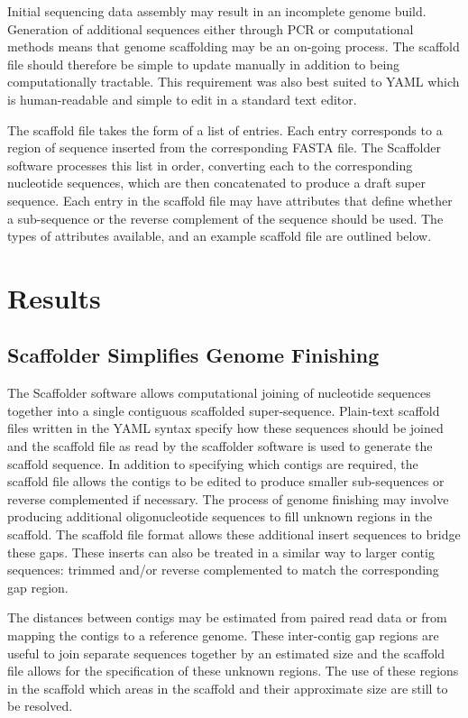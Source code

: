 \documentclass[10pt]{bmc_article}
\newenvironment{bmcformat}{\begin{raggedright}\baselineskip20pt\sloppy\setboolean{publ}{false}}{\end{raggedright}\baselineskip20pt\sloppy}
\begin{document}
\begin{bmcformat}
Initial sequencing data assembly may result in an incomplete genome build.
Generation of additional sequences either through PCR or computational methods
means that genome scaffolding may be an on-going process. The scaffold file
should therefore be simple to update manually in addition to being
computationally tractable. This requirement was also best suited to YAML which
is human-readable and simple to edit in a standard text editor. \pb

The scaffold file takes the form of a list of entries. Each entry corresponds
to a region of sequence inserted from the corresponding FASTA file. The
Scaffolder software processes this list in order, converting each to the
corresponding nucleotide sequences, which are then concatenated to produce
a draft super sequence. Each entry in the scaffold file may have attributes
that define whether a sub-sequence or the reverse complement of the sequence
should be used. The types of attributes available, and an example scaffold file
are outlined below. \pb

\clearpage

\section*{Results} %

\subsection*{Scaffolder Simplifies Genome Finishing} %

The Scaffolder software allows computational joining of nucleotide sequences
together into a single contiguous scaffolded super-sequence. Plain-text
scaffold files written in the YAML syntax specify how these sequences should be
joined and the scaffold file as read by the scaffolder software is used to
generate the scaffold sequence. In addition to specifying which contigs are
required, the scaffold file allows the contigs to be edited to produce smaller
sub-sequences or reverse complemented if necessary. The process of genome
finishing may involve producing additional oligonucleotide sequences to fill
unknown regions in the scaffold. The scaffold file format allows these
additional insert sequences to bridge these gaps. These inserts can also be
treated in a similar way to larger contig sequences: trimmed and/or reverse
complemented to match the corresponding gap region. \pb

The distances between contigs may be estimated from paired read data or from
mapping the contigs to a reference genome. These inter-contig gap regions are
useful to join separate sequences together by an estimated size and the
scaffold file allows for the specification of these unknown regions. The use of
these regions in the scaffold which areas in the scaffold and their approximate
size are still to be resolved. \pb


\end{bmcformat}
\end{document}
